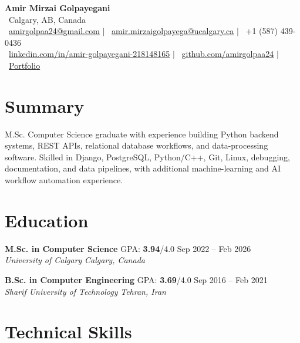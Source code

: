 \documentclass[a4paper,10pt]{article}
\newcommand{\resumeEducationSubheading}[5]{
    \textbf{#1} \hfill #2 \hfill #3 \\
    \textit{#4} \hfill \textit{#5}
}
\begin{document}

\begin{center}
    {\LARGE \textbf{Amir Mirzai Golpayegani}} \\[0.25em]
    \faMapMarker*~Calgary, AB, Canada \\[0.25em]
    \faEnvelope~\href{mailto:amirgolpaa24@gmail.com}{amirgolpaa24@gmail.com}
    $|$
    \faEnvelope~\href{mailto:amir.mirzaigolpayega@ucalgary.ca}{amir.mirzaigolpayega@ucalgary.ca}
    $|$
    \faPhone*~+1 (587) 439-0436 \\[0.25em]
    \faLinkedin~\href{https://linkedin.com/in/amir-golpayegani-218148165}{linkedin.com/in/amir-golpayegani-218148165}
    $|$
    \faGithub~\href{https://github.com/amirgolpaa24}{github.com/amirgolpaa24}
    $|$
    \faGlobe~\href{https://amir-portfolio-navy.vercel.app/}{Portfolio}
\end{center}


\section*{Summary}

M.Sc. Computer Science graduate with experience building Python backend systems, REST APIs, relational database workflows, and data-processing software. Skilled in Django, PostgreSQL, Python/C++, Git, Linux, debugging, documentation, and data pipelines, with additional machine-learning and AI workflow automation experience.


\section*{Education}

\resumeEducationSubheading
{M.Sc. in Computer Science}
{GPA: \textbf{3.94}/4.0}
{Sep 2022 -- Feb 2026}
{University of Calgary}
{Calgary, Canada}

\vspace{0.35em}

\resumeEducationSubheading
{B.Sc. in Computer Engineering}
{GPA: \textbf{3.69}/4.0}
{Sep 2016 -- Feb 2021}
{Sharif University of Technology}
{Tehran, Iran}


\section*{Technical Skills}
\end{document}
